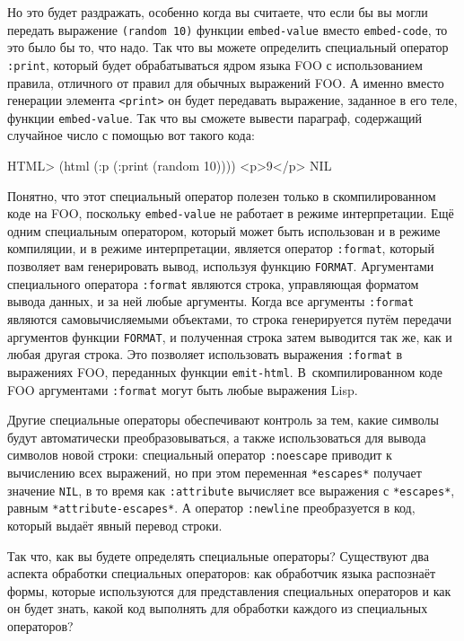 Но это будет раздражать, особенно когда вы считаете, что если бы вы могли передать
выражение \lstinline{(random 10)} функции \lstinline{embed-value} вместо \lstinline{embed-code}, то это
было бы то, что надо.  Так что вы можете определить специальный оператор \lstinline{:print},
который будет обрабатываться ядром языка FOO с использованием правила, отличного от правил
для обычных выражений FOO.  А именно вместо генерации элемента \lstinline{<print>} он будет
передавать выражение, заданное в его теле, функции \lstinline{embed-value}.  Так что вы сможете
вывести параграф, содержащий случайное число с помощью вот такого кода:

\begin{myverb}
HTML> (html (:p (:print (random 10))))
<p>9</p>
NIL
\end{myverb}

Понятно, что этот специальный оператор полезен только в скомпилированном коде на FOO,
поскольку \lstinline{embed-value} не работает в режиме интерпретации.  Ещё одним специальным
оператором, который может быть использован и в режиме компиляции, и в режиме
интерпретации, является оператор \lstinline{:format}, который позволяет вам генерировать вывод,
используя функцию \lstinline{FORMAT}.  Аргументами специального оператора \lstinline{:format}
являются строка, управляющая форматом вывода данных, и за ней любые аргументы.  Когда все
аргументы \lstinline{:format} являются самовычисляемыми  объектами, то
строка генерируется путём передачи аргументов функции \lstinline{FORMAT}, и полученная строка
затем выводится так же, как и любая другая строка.  Это позволяет использовать выражения
\lstinline{:format} в выражениях FOO, переданных функции \lstinline{emit-html}.  В~скомпилированном
коде FOO аргументами \lstinline{:format} могут быть любые выражения Lisp.

Другие специальные операторы обеспечивают контроль за тем, какие символы будут
автоматически преобразовываться, а также использоваться для вывода символов новой строки:
специальный оператор \lstinline{:noescape} приводит к вычислению всех выражений, но при этом
переменная \lstinline{*escapes*} получает значение \lstinline{NIL}, в то время как
\lstinline{:attribute} вычисляет все выражения с \lstinline{*escapes*}, равным
\lstinline{*attribute-escapes*}.  А оператор \lstinline{:newline} преобразуется в код, который
выдаёт явный перевод строки.

Так что, как вы будете определять специальные операторы?  Существуют два аспекта обработки
специальных операторов: как обработчик языка распознаёт формы, которые используются для
представления специальных операторов и как он будет знать, какой код выполнять для
обработки каждого из специальных операторов?

